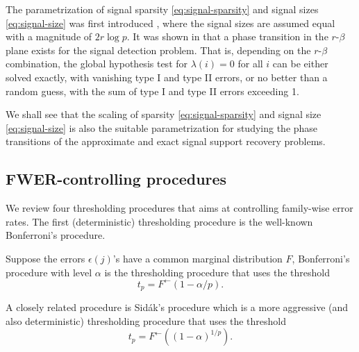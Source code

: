 \begin{remark}
The parametrization of signal sparsity \eqref{eq:signal-sparsity} and signal sizes  \eqref{eq:signal-size} was first introduced \citet{donoho2004higher}, where the signal sizes are assumed equal with a magnitude of $2{r}\log{p}$.
It was shown in \cite{donoho2004higher} that a phase transition in the $r$-$\beta$ plane exists for the signal detection problem. 
That is, depending on the $r$-$\beta$ combination, the global hypothesis test for $\lambda(i)=0$ for all $i$ can be either solved exactly, with vanishing type I and type II errors, or no better than a random guess, with the sum of type I and type II errors exceeding 1.

We shall see that the scaling of sparsity \eqref{eq:signal-sparsity} and signal size \eqref{eq:signal-size} is also the suitable parametrization for studying the phase transitions of the approximate and exact signal support recovery problems.
\end{remark}

\subsection{FWER-controlling procedures}
\label{subsec:FWER-controlling-procedures}

We review four thresholding procedures that aims at controlling family-wise error rates.
The first (deterministic) thresholding procedure is the well-known Bonferroni's procedure.
\begin{definition}
Suppose the errors $\epsilon(j)$'s have a common marginal distribution $F$, Bonferroni's procedure with level $\alpha$ is the thresholding procedure that uses the threshold
\begin{equation} \label{eq:Bonferroni-procedure}
    t_p = F^{\leftarrow}(1 - \alpha/p).
\end{equation}
\end{definition}
A closely related procedure is Sid\'ak's procedure \citep{vsidak1967rectangular}
which is a more aggressive (and also deterministic) thresholding procedure that uses the 
threshold
\begin{equation} \label{eq:Sidak-procedure}
    t_p = F^{\leftarrow}((1 - \alpha)^{1/p}).
\end{equation}

